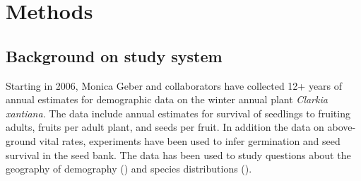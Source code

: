 \documentclass[12pt, oneside, titlepage]{article}   	%
\begin{document}

\section*{Methods}

\subsection*{Background on study system}

Starting in 2006, Monica Geber and collaborators have collected 12+ years of annual estimates for demographic data on the winter annual plant \textit{Clarkia xantiana}. The data include annual estimates for survival of seedlings to fruiting adults, fruits per adult plant, and seeds per fruit. In addition the data on above-ground vital rates, experiments have been used to infer germination and seed survival in the seed bank. The data has been used to study questions about the geography of demography (\cite{eckhart2011}) and species distributions (\cite{pironon2018}).
\end{document}
